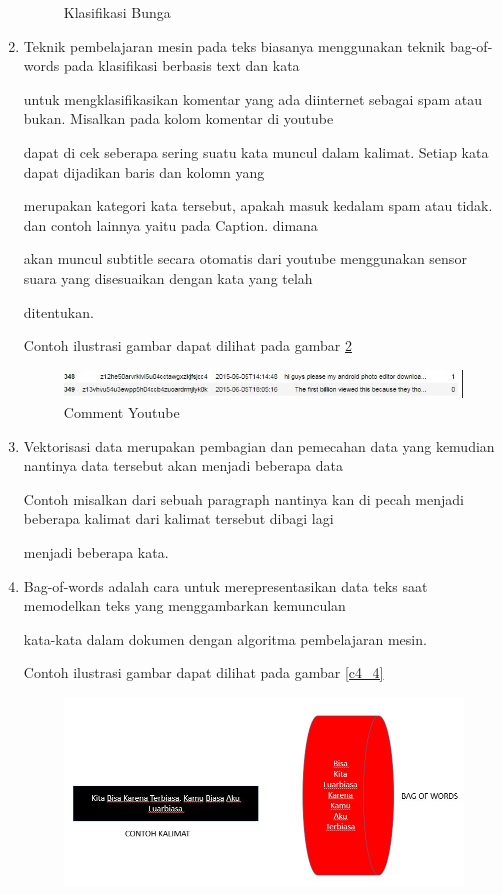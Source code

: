 \begin{enumerate}
\begin{figure}[!htbp]
	\caption{Klasifikasi Bunga}
	\label{c4_2}
\end{figure}
\item Teknik pembelajaran mesin pada teks biasanya menggunakan teknik bag-of-words pada klasifikasi berbasis text dan kata 
\par untuk mengklasifikasikan komentar yang ada diinternet sebagai spam atau bukan. Misalkan pada kolom komentar di youtube
\par dapat di cek seberapa sering suatu kata muncul dalam kalimat. Setiap kata dapat dijadikan baris dan kolomn yang 
\par merupakan kategori kata tersebut, apakah masuk kedalam spam atau tidak. dan contoh lainnya yaitu pada Caption. dimana
\par akan muncul subtitle secara otomatis dari youtube menggunakan sensor suara yang disesuaikan dengan kata yang telah 
\par ditentukan. 
\par Contoh ilustrasi gambar dapat dilihat pada gambar \ref{c4_3}
\begin{figure}[!htbp]
	\centerline{\includegraphics[width=1\textwidth]{figures/huda/chapter4/3.JPG}}
	\caption{Comment Youtube}
	\label{c4_3}
\end{figure}
\item Vektorisasi data merupakan pembagian dan pemecahan data yang kemudian nantinya data tersebut akan menjadi beberapa data
\par Contoh misalkan dari sebuah paragraph nantinya kan di pecah menjadi beberapa kalimat dari kalimat tersebut dibagi lagi
\par menjadi beberapa kata.
\item Bag-of-words adalah cara untuk merepresentasikan data teks saat memodelkan teks yang menggambarkan kemunculan 
\par kata-kata dalam dokumen dengan algoritma pembelajaran mesin.
\par Contoh ilustrasi gambar dapat dilihat pada gambar \ref{c4_4}
\begin{figure}[!htbp]
	\centerline{\includegraphics[width=1\textwidth]{figures/huda/chapter4/4.JPG}}

\end{figure}
\end{enumerate}
